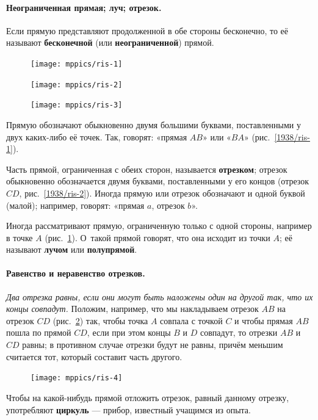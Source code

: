 \documentclass[oneside]{book}
\makeatletter
\newcommand{\rindex}[2][\imki@jobname]{%
  \index[#1]{\detokenize{#2}}%
}
\makeatother
\begin{document}
\paragraph{Неограниченная прямая; луч; отрезок.}\label{1938/5}
Если прямую представляют продолженной в обе стороны бесконечно, то её называют \textbf{бесконечной} (или \textbf{неограниченной}) прямой.

\begin{figure}
\centering
\texttt{[image: mppics/ris-1]}
\caption{}\label{1938/ris-1}
\bigskip
\texttt{[image: mppics/ris-2]}
\caption{}\label{1938/ris-2}
\bigskip
\texttt{[image: mppics/ris-3]}
\caption{}\label{1938/ris-3}
\end{figure}

Прямую обозначают обыкновенно двумя большими буквами, поставленными у двух каких-либо её точек.
Так, говорят:
«прямая $AB$» или «$BA$» (рис.~\ref{1938/ris-1}).

Часть прямой, ограниченная с обеих сторон, называется \rindex{отрезок}\textbf{отрезком};
отрезок обыкновенно обозначается двумя буквами, поставленными у его концов (отрезок $CD$, рис.~\ref{1938/ris-2}).
Иногда прямую или отрезок обозначают и одной буквой (малой);
например, говорят: «прямая $a$, отрезок $b$».

Иногда рассматривают прямую, ограниченную только с одной стороны, например в точке $A$ (рис.~\ref{1938/ris-3}).
О~такой прямой говорят, что она исходит из точки $A$;
её называют \rindex{луч}\textbf{лучом} или \rindex{полупрямая}\textbf{полупрямой}. %

\paragraph{Равенство и неравенство отрезков.}\label{1938/6}
\emph{Два отрезка равны, если они могут быть наложены один на другой так, что их концы совпадут.}
Положим, например, что мы накладываем отрезок $AB$ на
отрезок $CD$ (рис.~\ref{1938/ris-4}) так, чтобы точка $A$ совпала с точкой $C$ и чтобы прямая $AB$ пошла по прямой $CD$, если при этом концы $B$ и $D$ совпадут, то отрезки $AB$ и $CD$ равны;
в противном случае отрезки будут не равны, причём меньшим считается тот, который составит часть другого.


\begin{figure}[h!]
\centering
\texttt{[image: mppics/ris-4]}
\caption{}\label{1938/ris-4}
\end{figure}


Чтобы на какой-нибудь прямой отложить отрезок, равный данному отрезку, употребляют \textbf{циркуль} — прибор, известный учащимся из опыта.
\end{document}
